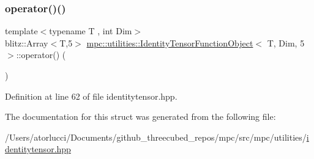 \subsubsection{\texorpdfstring{operator()()}{operator()()}}
{\footnotesize\ttfamily template$<$typename T , int Dim$>$ \\
blitz\+::\+Array$<$T,5$>$ \mbox{\hyperlink{structmpc_1_1utilities_1_1_identity_tensor_function_object}{mpc\+::utilities\+::\+Identity\+Tensor\+Function\+Object}}$<$ T, Dim, 5 $>$\+::operator() (\begin{DoxyParamCaption}{ }\end{DoxyParamCaption})\hspace{0.3cm}{\ttfamily [inline]}}



Definition at line 62 of file identitytensor.\+hpp.



The documentation for this struct was generated from the following file\+:\begin{DoxyCompactItemize}
\item 
/\+Users/atorlucci/\+Documents/github\+\_\+threecubed\+\_\+repos/mpc/src/mpc/utilities/\mbox{\hyperlink{identitytensor_8hpp}{identitytensor.\+hpp}}\end{DoxyCompactItemize}
